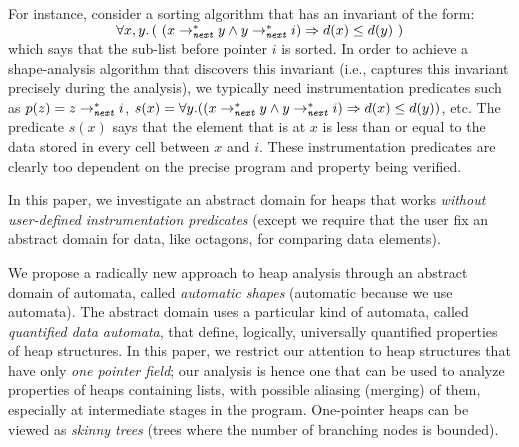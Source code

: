 \documentclass{llncs}
\newcommand{\next}{\texttt{next}}
\begin{document}
For instance, consider a sorting algorithm that has an invariant of the form:\\
$~~~~~~~~~~~~~~~~~~~~~~~\forall x, y. \left(~(x \rightarrow_\textit{\next}^* y \wedge y \rightarrow_\textit{\next}^* i) \Rightarrow d(x) \leq d(y)~\right)$\\
which says that the sub-list before pointer $i$ is sorted.
In order to achieve a shape-analysis algorithm that discovers this invariant
 (i.e., captures this invariant precisely during the analysis),
we typically need instrumentation predicates such as $p(z) = z \rightarrow_\textit{\next}^* i$,
$s(x) = \forall y. ((x \rightarrow_\textit{\next}^* y \wedge  y \rightarrow_\textit{\next}^* i) \Rightarrow d(x) \leq d(y))$, etc.
The predicate $s(x)$ says that the element that is at $x$ is less than
or equal to the data stored in every cell between $x$ and $i$.
These instrumentation predicates are clearly too dependent on the precise program and property
 being verified.



In this paper, we investigate an abstract domain for heaps that works \emph{without
user-defined instrumentation predicates} (except we require that the user fix an
abstract domain for data, like octagons, for comparing data elements).



We propose a radically new approach to heap analysis through an abstract domain
of automata, called \emph{automatic shapes} (automatic because we use automata).
The abstract domain uses a particular kind of automata, called \emph{quantified data automata}, that define, logically, universally quantified properties of heap structures. In this paper, we restrict our attention to heap structures that
have only \emph{one pointer field}; our analysis is hence one that can be used to analyze
properties of heaps containing lists, with possible aliasing (merging) of them,
especially at intermediate stages in the program. One-pointer heaps can be viewed
as \emph{skinny trees} (trees where the number of branching nodes is bounded).
\end{document}
